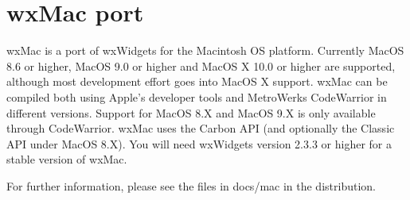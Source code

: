 \section{wxMac port}\label{wxmacport}

wxMac is a port of wxWidgets for the Macintosh OS platform.
Currently MacOS 8.6 or higher, MacOS 9.0 or higher and
MacOS X 10.0 or higher are supported, although most development
effort goes into MacOS X support. wxMac can be compiled both
using Apple's developer tools and MetroWerks CodeWarrior in
different versions. Support for MacOS 8.X and MacOS 9.X is
only available through CodeWarrior. wxMac uses the Carbon
API (and optionally the Classic API under MacOS 8.X). You
will need wxWidgets version 2.3.3 or higher for a stable
version of wxMac.

For further information, please see the files in docs/mac
in the distribution.

